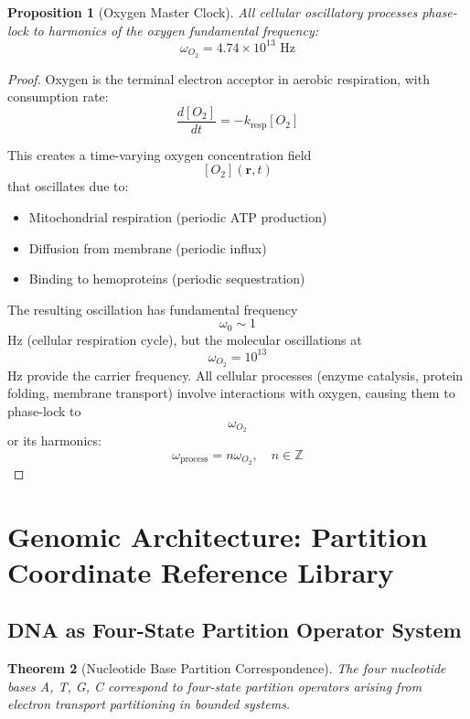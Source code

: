 \documentclass[12pt,a4paper]{article}
\newtheorem{theorem}{Theorem}
\newtheorem{proposition}[theorem]{Proposition}
\begin{document}
\begin{proposition}[Oxygen Master Clock]
All cellular oscillatory processes phase-lock to harmonics of the oxygen fundamental frequency:
$$
\omega_{O_2} = 4.74 \times 10^{13} \text{ Hz}
$$
\end{proposition}

\begin{proof}
Oxygen is the terminal electron acceptor in aerobic respiration, with consumption rate:
$$
\frac{d[O_2]}{dt} = -k_{\text{resp}} [O_2]
$$

This creates a time-varying oxygen concentration field $$[O_2](\mathbf{r}, t)$$ that oscillates due to:
\begin{itemize}
\item Mitochondrial respiration (periodic ATP production)
\item Diffusion from membrane (periodic influx)
\item Binding to hemoproteins (periodic sequestration)
\end{itemize}

The resulting oscillation has fundamental frequency $$\omega_0 \sim 1$$ Hz (cellular respiration cycle), but the molecular oscillations at $$\omega_{O_2} = 10^{13}$$ Hz provide the carrier frequency. All cellular processes (enzyme catalysis, protein folding, membrane transport) involve interactions with oxygen, causing them to phase-lock to $$\omega_{O_2}$$ or its harmonics:
$$
\omega_{\text{process}} = n \omega_{O_2}, \quad n \in \mathbb{Z}
$$
\end{proof}

\section{Genomic Architecture: Partition Coordinate Reference Library}

\subsection{DNA as Four-State Partition Operator System}

\begin{theorem}[Nucleotide Base Partition Correspondence]
The four nucleotide bases A, T, G, C correspond to four-state partition operators arising from electron transport partitioning in bounded systems.
\end{theorem}
\end{document}
